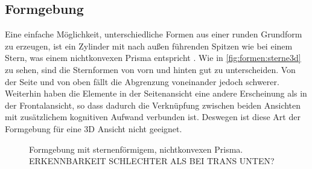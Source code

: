\subsection{Formgebung}\label{sec:grundlagen:formgebung}
Eine einfache Möglichkeit, unterschiedliche Formen aus einer runden Grundform zu erzeugen, ist ein Zylinder mit nach außen führenden Spitzen wie bei einem Stern, was einem nichtkonvexen Prisma entspricht \cite{UniformPolyhedra}. Wie in \autoref{fig:formen:sterne3d} zu sehen, sind die Sternformen von vorn und hinten gut zu unterscheiden. Von der Seite und von oben fällt die Abgrenzung voneinander jedoch schwerer. Weiterhin haben die Elemente in der Seitenansicht eine andere Erscheinung als in der Frontalansicht, so dass dadurch die Verknüpfung zwischen beiden Ansichten mit zusätzlichem kognitiven Aufwand verbunden ist. Deswegen ist diese Art der Formgebung für eine 3D Ansicht nicht geeignet.

\begin{figure}
	{\caption{Formgebung mit sternenförmigem, nichtkonvexen Prisma. ERKENNBARKEIT SCHLECHTER ALS BEI TRANS UNTEN?}\label{fig:formen:sterne3d}}
\end{figure}

